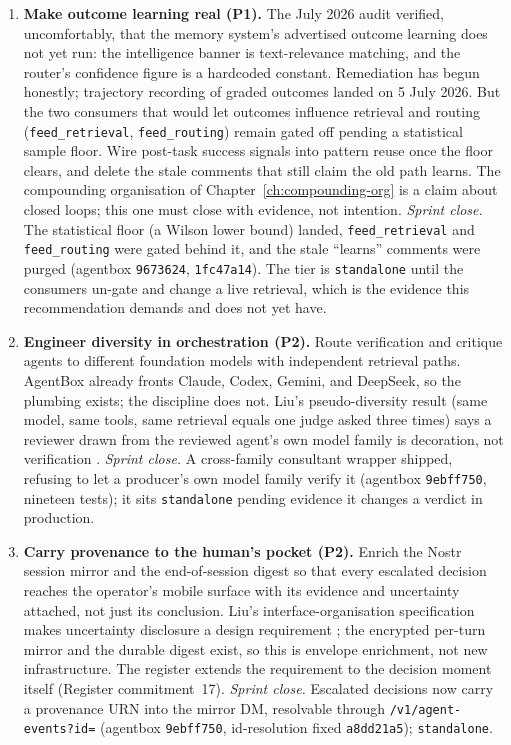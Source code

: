 \begin{enumerate}
  \item \textbf{Make outcome learning real (P1).} The July 2026 audit verified, uncomfortably, that the memory system's advertised outcome learning does not yet run: the intelligence banner is text-relevance matching, and the router's confidence figure is a hardcoded constant. Remediation has begun honestly; trajectory recording of graded outcomes landed on 5 July 2026. But the two consumers that would let outcomes influence retrieval and routing (\texttt{feed\_retrieval}, \texttt{feed\_routing}) remain gated off pending a statistical sample floor. Wire post-task success signals into pattern reuse once the floor clears, and delete the stale comments that still claim the old path learns. The compounding organisation of Chapter~\ref{ch:compounding-org} is a claim about closed loops; this one must close with evidence, not intention. \emph{Sprint close.} The statistical floor (a Wilson lower bound) landed, \texttt{feed\_retrieval} and \texttt{feed\_routing} were gated behind it, and the stale ``learns'' comments were purged (agentbox \texttt{9673624}, \texttt{1fc47a14}). The tier is \texttt{standalone} until the consumers un-gate and change a live retrieval, which is the evidence this recommendation demands and does not yet have.

  \item \textbf{Engineer diversity in orchestration (P2).} Route verification and critique agents to different foundation models with independent retrieval paths. AgentBox already fronts Claude, Codex, Gemini, and DeepSeek, so the plumbing exists; the discipline does not. Liu's pseudo-diversity result (same model, same tools, same retrieval equals one judge asked three times) says a reviewer drawn from the reviewed agent's own model family is decoration, not verification \parencite{Liu2026}. \emph{Sprint close.} A cross-family consultant wrapper shipped, refusing to let a producer's own model family verify it (agentbox \texttt{9ebff750}, nineteen tests); it sits \texttt{standalone} pending evidence it changes a verdict in production.

  \item \textbf{Carry provenance to the human's pocket (P2).} Enrich the Nostr session mirror and the end-of-session digest so that every escalated decision reaches the operator's mobile surface with its evidence and uncertainty attached, not just its conclusion. Liu's interface-organisation specification makes uncertainty disclosure a design requirement \parencite{Liu2026}; the encrypted per-turn mirror and the durable digest exist, so this is envelope enrichment, not new infrastructure. The register extends the requirement to the decision moment itself (Register commitment~17). \emph{Sprint close.} Escalated decisions now carry a provenance URN into the mirror DM, resolvable through \texttt{/v1/agent-events?id=} (agentbox \texttt{9ebff750}, id-resolution fixed \texttt{a8dd21a5}); \texttt{standalone}.


\end{enumerate}
